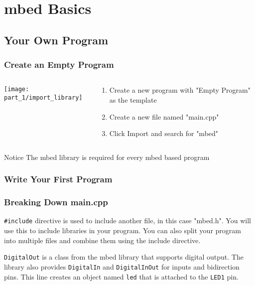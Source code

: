 \section{mbed Basics}
\subsection{Your Own Program}
\begin{frame}
	\frametitle{Create an Empty Program}
	\begin{columns}[T]
		\begin{column}{0.5\textwidth}
			\texttt{[image: part\_1/import\_library]}
		\end{column}
		\begin{column}{0.5\textwidth}
			\begin{enumerate}
				\item Create a new program with "Empty Program" as the template
				\item Create a new file named "main.cpp"
				\item Click Import and search for "mbed"
			\end{enumerate}
		\end{column}
	\end{columns}
	\begin{block}{Notice}
		The mbed library is required for every mbed based program
	\end{block}
\end{frame}

\begin{frame}[fragile]
	\frametitle{Write Your First Program}
	
\end{frame}

\begin{frame}[fragile]
	\frametitle{Breaking Down main.cpp}
	
	\lstinline{#include} directive is used to include another file, in this case "mbed.h".
	You will use this to include libraries in your program.
	You can also split your program into multiple files and combine them using the include directive.
	
	
	\lstinline{DigitalOut} is a class from the mbed library that supports digital output.
	The library also provides \lstinline{DigitalIn} and \lstinline{DigitalInOut} for inputs and bidirection pins.
	This line creates an object named \lstinline{led} that is attached to the \lstinline{LED1} pin.
\end{frame}

